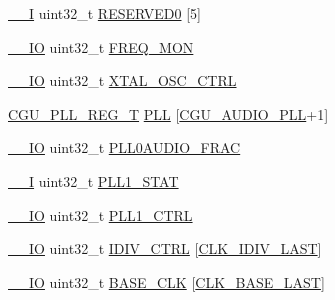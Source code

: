 \begin{DoxyCompactItemize}
\item 
\hyperlink{core__sc300_8h_af63697ed9952cc71e1225efe205f6cd3}{\+\_\+\+\_\+I} uint32\+\_\+t \hyperlink{struct_l_p_c___c_g_u___t_aebb83c538adc57d68f942881f3e16281}{R\+E\+S\+E\+R\+V\+E\+D0} \mbox{[}5\mbox{]}
\item 
\hyperlink{core__sc300_8h_aec43007d9998a0a0e01faede4133d6be}{\+\_\+\+\_\+\+IO} uint32\+\_\+t \hyperlink{struct_l_p_c___c_g_u___t_ac8b0e6717ad9d4be4828829ead570832}{F\+R\+E\+Q\+\_\+\+M\+ON}
\item 
\hyperlink{core__sc300_8h_aec43007d9998a0a0e01faede4133d6be}{\+\_\+\+\_\+\+IO} uint32\+\_\+t \hyperlink{struct_l_p_c___c_g_u___t_a8c74683d8e3fd22949ffd896f4d42218}{X\+T\+A\+L\+\_\+\+O\+S\+C\+\_\+\+C\+T\+RL}
\item 
\hyperlink{struct_c_g_u___p_l_l___r_e_g___t}{C\+G\+U\+\_\+\+P\+L\+L\+\_\+\+R\+E\+G\+\_\+T} \hyperlink{struct_l_p_c___c_g_u___t_a8119fc2f4b51375692557471f1142301}{P\+LL} \mbox{[}\hyperlink{group___c_l_o_c_k__18_x_x__43_x_x_ggabdd04536f16b3c7b588757d024e53da6a417d44002637aeeb1b62b42c39723cc1}{C\+G\+U\+\_\+\+A\+U\+D\+I\+O\+\_\+\+P\+LL}+1\mbox{]}
\item 
\hyperlink{core__sc300_8h_aec43007d9998a0a0e01faede4133d6be}{\+\_\+\+\_\+\+IO} uint32\+\_\+t \hyperlink{struct_l_p_c___c_g_u___t_a05c018f040f016782534031a9da985ee}{P\+L\+L0\+A\+U\+D\+I\+O\+\_\+\+F\+R\+AC}
\item 
\hyperlink{core__sc300_8h_af63697ed9952cc71e1225efe205f6cd3}{\+\_\+\+\_\+I} uint32\+\_\+t \hyperlink{struct_l_p_c___c_g_u___t_a1c60675e0c0d4b7ff16e9280f4d53875}{P\+L\+L1\+\_\+\+S\+T\+AT}
\item 
\hyperlink{core__sc300_8h_aec43007d9998a0a0e01faede4133d6be}{\+\_\+\+\_\+\+IO} uint32\+\_\+t \hyperlink{struct_l_p_c___c_g_u___t_a4c83b408f51945f396e049b8417d2787}{P\+L\+L1\+\_\+\+C\+T\+RL}
\item 
\hyperlink{core__sc300_8h_aec43007d9998a0a0e01faede4133d6be}{\+\_\+\+\_\+\+IO} uint32\+\_\+t \hyperlink{struct_l_p_c___c_g_u___t_ab4dcc7e3d60c588f6302cf34016817dc}{I\+D\+I\+V\+\_\+\+C\+T\+RL} \mbox{[}\hyperlink{chip__clocks_8h_ad9480404e0134b79428e4c7efdd5869da6bf0e8a9dd6907d1b78038d44421b881}{C\+L\+K\+\_\+\+I\+D\+I\+V\+\_\+\+L\+A\+ST}\mbox{]}
\item 
\hyperlink{core__sc300_8h_aec43007d9998a0a0e01faede4133d6be}{\+\_\+\+\_\+\+IO} uint32\+\_\+t \hyperlink{struct_l_p_c___c_g_u___t_a33d4c0ad50a5fe9bae6223fd9b49fa5b}{B\+A\+S\+E\+\_\+\+C\+LK} \mbox{[}\hyperlink{chip__clocks_8h_a7ffa0364100f6211eb00290d309133d0a4174a4a8b5df9269c2548c2fd1299c2d}{C\+L\+K\+\_\+\+B\+A\+S\+E\+\_\+\+L\+A\+ST}\mbox{]}
\end{DoxyCompactItemize}


